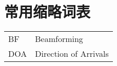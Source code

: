 \chapter{常用缩略词表}

\begin{tabular}{p{7em}p{25em}}
	BF  & Beamforming           \\
	DOA & Direction of Arrivals
\end{tabular}
